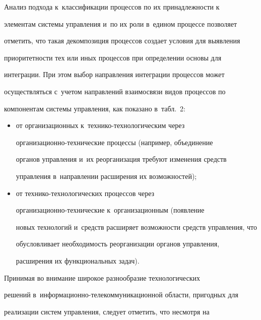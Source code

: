        


      Анализ подхода к~классификации процессов по их принадлежности к~


элементам системы управления и~по их роли в~едином процессе позволяет 


отметить, что такая декомпозиция процессов создает условия для выявления 


приоритетности тех или иных процессов при определении основы для 


интеграции. При этом выбор направления интеграции процессов может 


осуществляться с~учетом направлений взаимосвязи видов процессов по 


компонентам системы управления, как показано в~табл.~2:


      \begin{itemize}


      \item от организационных к~тех\-ни\-ко-тех\-но\-ло\-ги\-че\-ским через  


ор\-га\-ни\-за\-ци\-он\-но-тех\-ни\-че\-ские процессы (например, объединение 


органов управления и~их реорганизация требуют изменения средств 


управления в~направлении расширения их возможностей);\\[-14pt]


      \item от технико-технологических процессов через  


ор\-га\-ни\-за\-ци\-он\-но-тех\-ни\-че\-ские к~организационным (появление 


новых технологий и~средств расширяет возможности средств управления, что 


обусловливает необходимость реорганизации органов управления, 


расширения их функциональных задач).


\end{itemize}








      


      Принимая во внимание широкое разнообразие технологических 


решений в~информационно-телекоммуникационной области, пригодных для 


реализации систем управления, следует отметить, что несмотря на 


